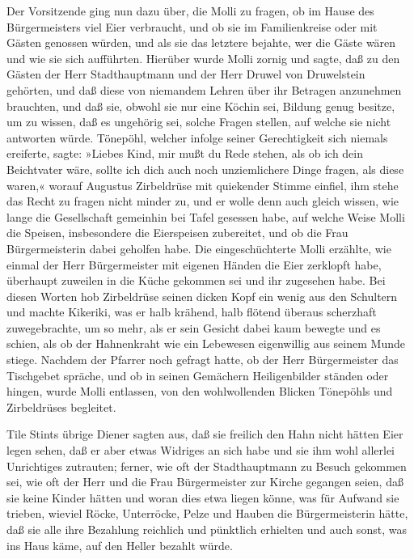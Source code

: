 \pagenum{[28]}Der Vorsitzende ging nun dazu über, die Molli zu
fragen, ob im Hause des Bürgermeisters viel Eier verbraucht, und ob
sie im Familienkreise oder mit Gästen genossen würden, und als sie
das letztere bejahte, wer die Gäste wären und wie sie sich
aufführten. Hierüber wurde Molli zornig und sagte, daß zu den
Gästen der Herr Stadthauptmann und der Herr Druwel von Druwelstein
gehörten, und daß diese von niemandem Lehren über ihr Betragen
anzunehmen brauchten, und daß sie, obwohl sie nur eine Köchin sei,
Bildung genug besitze, um zu wissen, daß es ungehörig sei, solche
Fragen stellen, auf welche sie nicht antworten würde. Tönepöhl,
welcher infolge seiner Gerechtigkeit sich niemals ereiferte, sagte:
»Liebes Kind, mir mußt du Rede stehen, als ob ich dein Beichtvater
wäre, sollte ich dich auch noch unziemlichere Dinge fragen, als
diese waren,« worauf Augustus Zirbeldrüse mit quiekender Stimme
einfiel, ihm stehe das Recht zu fragen nicht minder zu, und er
wolle denn auch gleich wissen, wie lange die Gesellschaft gemeinhin
bei Tafel gesessen habe, auf welche Weise Molli die Speisen,
insbesondere die Eierspeisen zubereitet, und ob die Frau
Bürgermeisterin dabei geholfen habe. Die eingeschüchterte Molli
erzählte, wie einmal der Herr Bürgermeister mit eigenen Händen die
Eier zerklopft habe, überhaupt zuweilen in die Küche gekommen sei
und ihr zugesehen habe. Bei diesen Worten hob Zirbeldrüse seinen
dicken Kopf ein wenig aus den Schultern und machte Kikeriki, was er
halb krähend, halb flötend überaus scherzhaft zuwegebrachte, um so
mehr, als er sein Gesicht dabei kaum bewegte und es schien, als ob
der Hahnenkraht wie ein Lebewesen eigenwillig aus seinem Munde
stiege. Nachdem der Pfarrer noch gefragt hatte, ob der Herr
Bürgermeister das Tischgebet\pagenum{[29]} spräche, und ob in
seinen Gemächern Heiligenbilder ständen oder hingen, wurde Molli
entlassen, von den wohlwollenden Blicken Tönepöhls und Zirbeldrüses
begleitet.

Tile Stints übrige Diener sagten aus, daß sie freilich den Hahn
nicht hätten Eier legen sehen, daß er aber etwas Widriges an sich
habe und sie ihm wohl allerlei Unrichtiges zutrauten; ferner, wie
oft der Stadthauptmann zu Besuch gekommen sei, wie oft der Herr und
die Frau Bürgermeister zur Kirche gegangen seien, daß sie keine
Kinder hätten und woran dies etwa liegen könne, was für Aufwand sie
trieben, wieviel Röcke, Unterröcke, Pelze und Hauben die
Bürgermeisterin hätte, daß sie alle ihre Bezahlung reichlich und
pünktlich erhielten und auch sonst, was ins Haus käme, auf den
Heller bezahlt würde.

